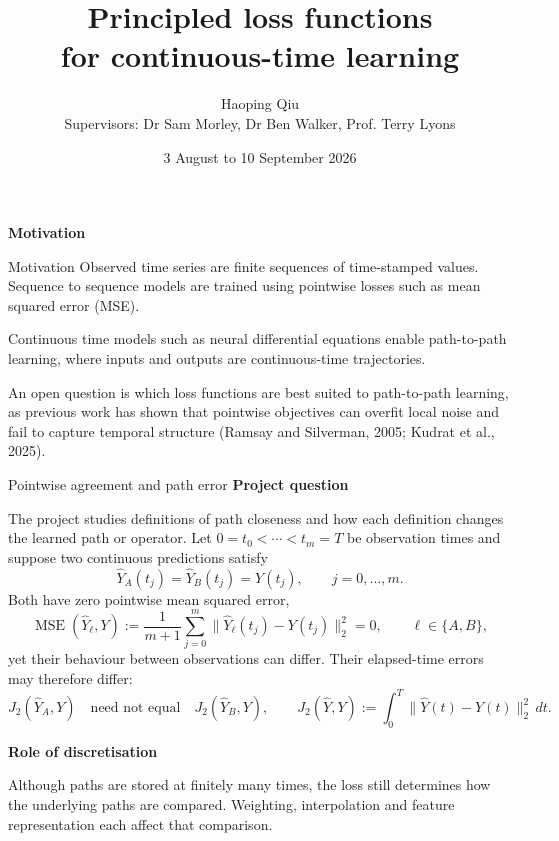 \documentclass[aspectratio=169,9pt]{beamer}
\title[Pathwise losses]{Principled loss functions\\
for continuous-time learning}
\author[Haoping Qiu]{Haoping Qiu\\[0.25cm]{\small Supervisors: Dr Sam Morley, Dr Ben Walker, Prof. Terry Lyons}}
\institute{Mathematical Institute, University of Oxford\\DataSig}
\date[September 2026]{3 August to 10 September 2026}
\newcommand{\Jtwo}{J_2}
\newcommand{\dividerframe}[1]{%
  \begin{frame}{\strut}%
    \vfill
    \centering
    {\usebeamercolor[fg]{frametitle}\huge\bfseries #1}\par
    \vfill
  \end{frame}%
}
\begin{document}
\begin{frame}[plain]
  \titlepage
\end{frame}

\dividerframe{Motivation}

\begin{frame}{Motivation}
Observed time series are finite sequences of time-stamped values. Sequence to sequence models are trained using pointwise losses such as mean squared error (MSE).

Continuous time models such as neural differential equations enable path-to-path learning, where inputs and outputs are continuous-time trajectories.

An open question is which loss functions are best suited to path-to-path learning, as previous work has shown that pointwise objectives can overfit local noise and fail to capture temporal structure (Ramsay and Silverman, 2005; Kudrat et al., 2025).
\end{frame}

\begin{frame}{Pointwise agreement and path error}
  \small
  \textbf{Project question}\par
  The project studies definitions of path closeness and how each definition changes the learned path or operator. Let $0=t_0<\cdots<t_m=T$ be observation times and suppose two continuous predictions satisfy
  \[
    \widehat Y_A(t_j)=\widehat Y_B(t_j)=Y(t_j),
    \qquad j=0,\ldots,m.
  \]
  Both have zero pointwise mean squared error,
  \[
    \operatorname{MSE}(\widehat Y_\ell,Y)
    :=\frac1{m+1}\sum_{j=0}^{m}\|\widehat Y_\ell(t_j)-Y(t_j)\|_2^2=0,
    \qquad \ell\in\{A,B\},
  \]
  yet their behaviour between observations can differ. Their elapsed-time errors may therefore differ:
  \[
    \Jtwo(\widehat Y_A,Y)
    \quad\text{need not equal}\quad
    \Jtwo(\widehat Y_B,Y),
    \qquad
    \Jtwo(\widehat Y,Y):=\int_0^T\|\widehat Y(t)-Y(t)\|_2^2\,dt.
  \]

  \textbf{Role of discretisation}\par
  Although paths are stored at finitely many times, the loss still determines how the underlying paths are compared. Weighting, interpolation and feature representation each affect that comparison.

\end{frame}
\end{document}
